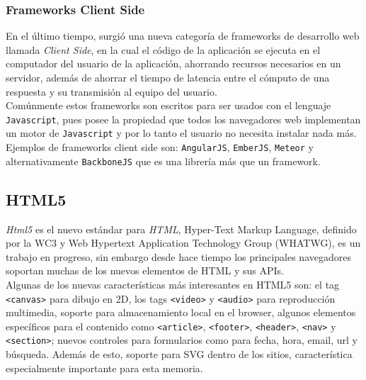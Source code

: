 \subsubsection{Frameworks Client Side} %
\label{ssub:frameworks_client_side}
En el último tiempo, surgió una nueva categoría de frameworks de desarrollo web llamada \emph{Client Side}, en la cual el código de la aplicación se ejecuta en el computador del usuario de la aplicación, ahorrando recursos necesarios en un servidor, además de ahorrar el tiempo de latencia entre el cómputo de una respuesta y su transmisión al equipo del usuario.\\

Comúnmente estos frameworks son escritos para ser usados con el lenguaje \texttt{Javascript}, pues posee la propiedad que todos los navegadores web implementan un motor de \texttt{Javascript} y por lo tanto el usuario no necesita instalar nada más. Ejemplos de frameworks client side son: \texttt{AngularJS}\cite{angular}, \texttt{EmberJS}\cite{ember}, \texttt{Meteor}\cite{meteor} y alternativamente \texttt{BackboneJS}\cite{backbone} que es una librería más que un framework.


% 
% 
% 
\subsection{HTML5} %
\label{sub:html5}

\emph{Html5}\cite{html5} es el nuevo estándar para \emph{HTML}, Hyper-Text Markup Language, definido por la WC3\cite{w3c} y Web Hypertext Application Technology Group (WHATWG), es un trabajo en progreso, sin embargo desde hace tiempo los principales navegadores soportan muchas de los nuevos elementos de HTML y sus APIs.\\

Algunas de los nuevas características más interesantes en HTML5 son: el tag \texttt{<canvas>} para dibujo en 2D, los tags \texttt{<video>} y \texttt{<audio>} para reproducción multimedia, soporte para almacenamiento local en el browser, algunos elementos específicos para el contenido como \texttt{<article>}, \texttt{<footer>}, \texttt{<header>}, \texttt{<nav>} y \texttt{<section>}; nuevos controles para formularios como para fecha, hora, email, url y búsqueda. Además de esto, soporte para SVG dentro de los sitios, característica especialmente importante para esta memoria.


